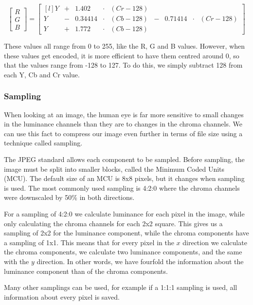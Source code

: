 \begin{infobox}
$$\begin{bmatrix}
	R\\G\\B
\end{bmatrix} = \begin{bmatrix*}[l]
	Y&+&1.402 &\cdot & (Cr-128)&\\
	Y &-& 0.34414&\cdot &(Cb-128) &- &0.71414&\cdot&(Cr-128)\\
	Y &+& 1.772&\cdot& (Cb-128)&
\end{bmatrix*}$$

These values all range from 0 to 255, like the R, G and B values. 
However, when these values get encoded, it is more efficient to have them centred around 0, so that the values range from -128 to 127.
To do this, we simply subtract 128 from each Y, Cb and Cr value.

\vspace{4mm}
\subsubsection{Sampling}
\vspace{-2.5mm}
When looking at an image, the human eye is far more sensitive to small changes in the luminance channels than they are to changes in the chroma channels.
We can use this fact to compress our image even further in terms of file size using a technique called sampling. 

The JPEG standard allows each component to be sampled.
Before sampling, the image must be split into smaller blocks, called the Minimum Coded Units (MCU).
The default size of an MCU is 8x8 pixels, but it changes when sampling is used.
The most commonly used sampling is 4:2:0 where the chroma channels were downscaled by 50\% in both directions. 

For a sampling of 4:2:0 we calculate luminance for each pixel in the image, while only calculating the chroma channels for each 2x2 square.
This gives us a sampling of 2x2 for the luminance component, while the chroma components have a sampling of 1x1.
This means that for every pixel in the $x$ direction we calculate the chroma components, we calculate two luminance components, and the same with the $y$ direction.
In other words, we have fourfold the information about the luminance component than of the chroma components.

Many other samplings can be used, for example if a 1:1:1 sampling is used, all information about every pixel is saved.


\end{infobox}
